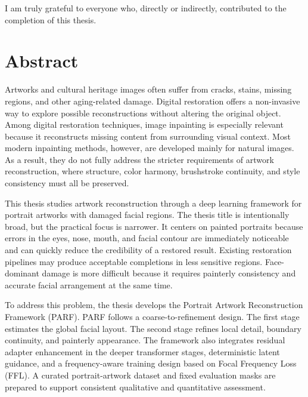 \documentclass[12pt, twoside]{report}
\begin{document}
I am truly grateful to everyone who, directly or indirectly, contributed to the completion of this thesis.

\thispagestyle{empty}
\tableofcontents

\listoffigures
{}

\listoftables
{}



\chapter*{Abstract}
Artworks and cultural heritage images often suffer from cracks, stains, missing regions, and other aging-related damage. Digital restoration offers a non-invasive way to explore possible reconstructions without altering the original object. Among digital restoration techniques, image inpainting is especially relevant because it reconstructs missing content from surrounding visual context. Most modern inpainting methods, however, are developed mainly for natural images. As a result, they do not fully address the stricter requirements of artwork reconstruction, where structure, color harmony, brushstroke continuity, and style consistency must all be preserved.

This thesis studies artwork reconstruction through a deep learning framework for portrait artworks with damaged facial regions. The thesis title is intentionally broad, but the practical focus is narrower. It centers on painted portraits because errors in the eyes, nose, mouth, and facial contour are immediately noticeable and can quickly reduce the credibility of a restored result. Existing restoration pipelines may produce acceptable completions in less sensitive regions. Face-dominant damage is more difficult because it requires painterly consistency and accurate facial arrangement at the same time.

To address this problem, the thesis develops the Portrait Artwork Reconstruction Framework (PARF). PARF follows a coarse-to-refinement design. The first stage estimates the global facial layout. The second stage refines local detail, boundary continuity, and painterly appearance. The framework also integrates residual adapter enhancement in the deeper transformer stages, deterministic latent guidance, and a frequency-aware training design based on Focal Frequency Loss (FFL). A curated portrait-artwork dataset and fixed evaluation masks are prepared to support consistent qualitative and quantitative assessment.
\end{document}

